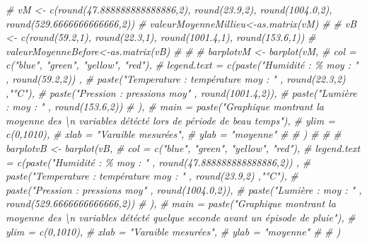 \documentclass[
]{article}
\newenvironment{Shaded}{\begin{snugshade}}{\end{snugshade}}
\newcommand{\CommentTok}[1]{\textcolor[rgb]{0.56,0.35,0.01}{\textit{#1}}}
\begin{document}
\begin{Shaded}
\begin{Highlighting}[]
\CommentTok{\# vM \textless{}{-} c(round(47.888888888888886,2), round(23.9,2), round(1004.0,2), round(529.6666666666666,2))}
\CommentTok{\# valeurMoyenneMillieu\textless{}{-}as.matrix(vM)}
\CommentTok{\# }
\CommentTok{\# vB \textless{}{-} c(round(59.2,1), round(22.3,1), round(1001.4,1), round(153.6,1))}
\CommentTok{\# valeurMoyenneBefore\textless{}{-}as.matrix(vB)}
\CommentTok{\# }
\CommentTok{\# }
\CommentTok{\# barplotvM \textless{}{-} barplot(vM,}
\CommentTok{\#                        col = c("blue", "green", "yellow", "red"),}
\CommentTok{\#                        legend.text = c(paste("Humidité : \% moy : " , round(59.2,2)) ,}
\CommentTok{\#                                        paste("Temperature : température moy : " , round(22.3,2) ,"°C"),}
\CommentTok{\#                                        paste("Pression :  pressions moy" , round(1001.4,2)),}
\CommentTok{\#                                        paste("Lumière :  moy : " , round(153.6,2)) }
\CommentTok{\#                                        ),}
\CommentTok{\#                        main = paste("Graphique montrant la moyenne des \textbackslash{}n variables détécté lors de période de beau temps"),}
\CommentTok{\#                        ylim = c(0,1010),}
\CommentTok{\#                        xlab = "Varaible mesurées",}
\CommentTok{\#                        ylab = "moyenne"}
\CommentTok{\#                        }
\CommentTok{\# )}
\CommentTok{\# }
\CommentTok{\# }
\CommentTok{\# barplotvB \textless{}{-} barplot(vB,}
\CommentTok{\#                        col = c("blue", "green", "yellow", "red"),}
\CommentTok{\#                        legend.text = c(paste("Humidité : \% moy : " , round(47.888888888888886,2)) ,}
\CommentTok{\#                                        paste("Temperature : température moy : " , round(23.9,2) ,"°C"),}
\CommentTok{\#                                        paste("Pression :  pressions moy" , round(1004.0,2)),}
\CommentTok{\#                                        paste("Lumière :  moy : " , round(529.6666666666666,2)) }
\CommentTok{\#                                        ),}
\CommentTok{\#                        main = paste("Graphique montrant la moyenne des \textbackslash{}n variables détécté quelque seconde avant un épisode de pluie"),}
\CommentTok{\#                        ylim = c(0,1010),}
\CommentTok{\#                        xlab = "Varaible mesurées",}
\CommentTok{\#                        ylab = "moyenne"}
\CommentTok{\#                        }
\CommentTok{\# )}



\end{Highlighting}
\end{Shaded}
\end{document}
